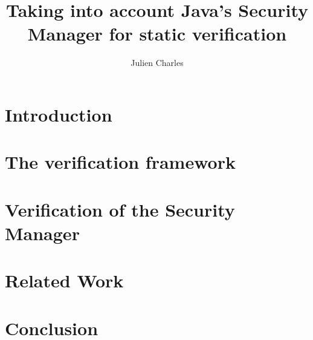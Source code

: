 \documentclass[draft]{llncs}
\begin{document}
\newcommand{\rarrow}{$\rightarrow$}
\newcommand{\conj}{$\wedge$}
\newcommand{\disjonc}{$\vee$}
\newcommand{\s}{\,}
\newcommand{\btab}{\begin{tt}\begin{tabbing}}
\newcommand{\etab}{\end{tabbing}\end{tt}}
\newcommand{\bcode}{\begin{tt}\begin{small}\begin{tabbing}}
\newcommand{\ecode}{\end{tabbing}\end{small}\end{tt}}
%
\frontmatter %
%

\mainmatter %
%
\title{Taking into account Java's Security Manager for static
verification}
%
%
\author{Julien Charles}
%
%
%

\maketitle %

\begin{abstract}

\end{abstract}
%
\section{Introduction}




\section{The verification framework}
\label{framework}



%
\section{Verification of the Security Manager}
\label{example}


\section{Related Work}
\label{related}

\section{Conclusion}
\label{conclusion}

%
%




%
\end{document}
